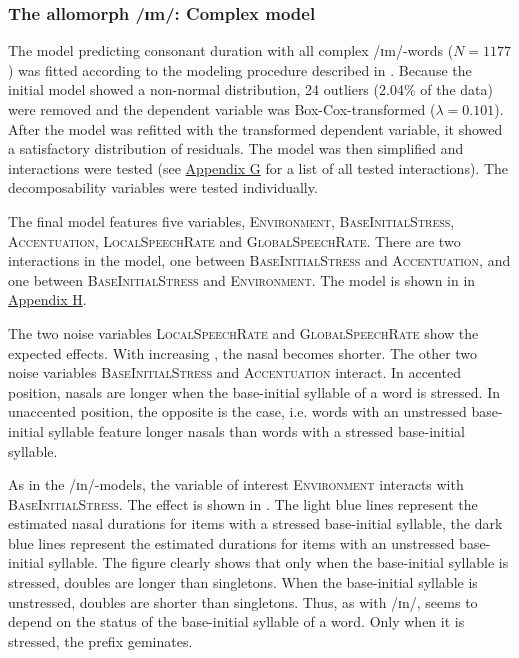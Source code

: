 \subsubsection{The allomorph /ɪm/: Complex model}


The model predicting consonant duration with all complex /ɪm/-words ($N=1177$) was fitted according to the modeling procedure described in .
Because the initial model showed a non-normal distribution,  24 outliers (2.04\% of the data) were removed and the dependent variable was Box-Cox-transformed ($\lambda = 0.101$).  
After the model was refitted with the transformed dependent variable, it showed a satisfactory distribution of residuals. The model was then simplified and interactions were tested (see \hyperref[Appendix G Summaries of tested interactions in experimental study]{Appendix G} for a list of all tested interactions). 
The decomposability variables were tested individually.\pagebreak



The final model features five variables, \textsc{Environment}, \textsc{BaseInitialStress}, \textsc{Accentuation}, \textsc{LocalSpeechRate} and \textsc{GlobalSpeechRate}. There are two interactions in the model, one between \textsc{BaseInitialStress} and \textsc{Accentuation}, and one between \textsc{BaseInitialStress} and \textsc{Environment}. The model is shown in  in \hyperref[Appendix H: Model Summaries Experiment]{Appendix H}.

The two noise variables \textsc{LocalSpeechRate} and \textsc{GlobalSpeechRate} show the expected effects. With increasing , the nasal becomes shorter.
 The other two noise variables \textsc{BaseInitialStress} and \textsc{Accentuation} interact. In accented position, nasals are longer when the base-initial syllable of a word is stressed. In unaccented position, the opposite is the case, i.e. words with an unstressed base-initial syllable feature longer nasals than words with a stressed base-initial syllable. 
 


As in the /ɪn/-models, the variable of interest \textsc{Environment} interacts with \textsc{BaseInitialStress}. The effect is shown in . 
The light blue lines represent the estimated nasal durations for items with a stressed base-initial syllable, the dark blue lines represent  the estimated durations for items with an unstressed base-initial syllable.
The figure clearly shows that 
 only when the base-initial syllable is stressed, doubles are  longer than singletons. When the base-initial syllable is unstressed, doubles are shorter than singletons. 
Thus, as with /ɪn/,  seems to depend on the  status of the base-initial syllable of a word. Only when it is stressed, the prefix  geminates.

